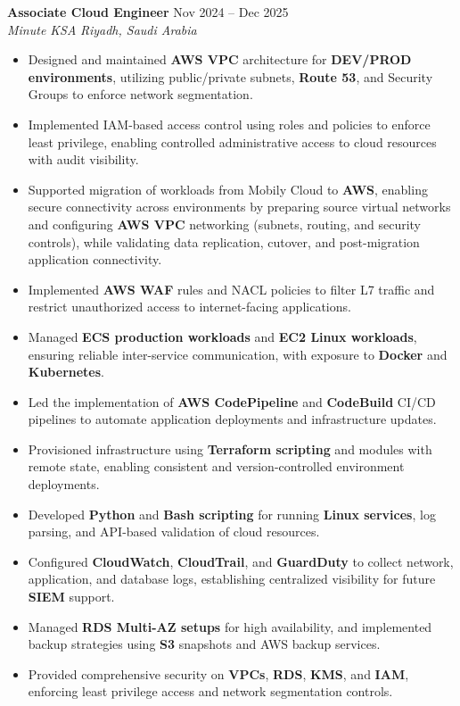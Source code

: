 \documentclass[10pt,a4paper]{article}
\newcommand{\jobheading}[4]{
  \vspace{0.2ex}\noindent
  \textbf{#1} \hfill #2 \\
  \textit{#3} \hfill \textit{#4} \vspace{0.2ex}
}
\begin{document}
\jobheading{Associate Cloud Engineer}{Nov 2024 – Dec 2025}{Minute KSA}{Riyadh, Saudi Arabia}
\begin{itemize}[leftmargin=*,itemsep=1pt,parsep=0pt]
\item Designed and maintained \textbf{AWS VPC} architecture for \textbf{DEV/PROD environments}, utilizing public/private subnets, \textbf{Route 53}, and Security Groups to enforce network segmentation.
\item Implemented IAM-based access control using roles and policies to enforce least privilege, enabling controlled administrative access to cloud resources with audit visibility.
\item Supported migration of workloads from Mobily Cloud to \textbf{AWS}, enabling secure connectivity across environments by preparing source virtual networks and configuring \textbf{AWS VPC} networking (subnets, routing, and security controls), while validating data replication, cutover, and post-migration application connectivity.
\item Implemented \textbf{AWS WAF} rules and NACL policies to filter L7 traffic and restrict unauthorized access to internet-facing applications.
\item Managed \textbf{ECS production workloads} and \textbf{EC2 Linux workloads}, ensuring reliable inter-service communication, with exposure to \textbf{Docker} and \textbf{Kubernetes}.
\item Led the implementation of \textbf{AWS CodePipeline} and \textbf{CodeBuild} CI/CD pipelines to automate application deployments and infrastructure updates.
\item Provisioned infrastructure using \textbf{Terraform scripting} and modules with remote state, enabling consistent and version-controlled environment deployments.
\item Developed \textbf{Python} and \textbf{Bash scripting} for running \textbf{Linux services}, log parsing, and API-based validation of cloud resources.
\item Configured \textbf{CloudWatch}, \textbf{CloudTrail}, and \textbf{GuardDuty} to collect network, application, and database logs, establishing centralized visibility for future \textbf{SIEM} support.
\item Managed \textbf{RDS Multi-AZ setups} for high availability, and implemented backup strategies using \textbf{S3} snapshots and AWS backup services.
\item Provided comprehensive security on \textbf{VPCs}, \textbf{RDS}, \textbf{KMS}, and \textbf{IAM}, enforcing least privilege access and network segmentation controls.
\end{itemize}
\end{document}
